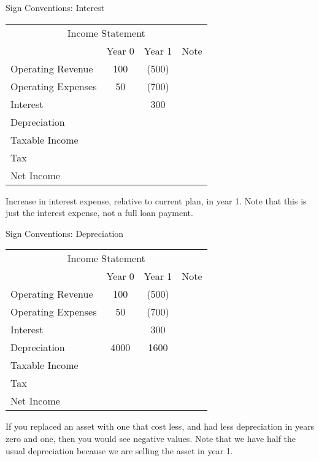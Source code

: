 \documentclass[ignorenonframetext,]{beamer}
\begin{document}
\begin{frame}{Sign Conventions: Interest}

\begin{table}[h]
\begin{tabular}{l||c|c||p{3cm}}
\multicolumn{4}{c}{Income Statement}\\
  &Year 0  &Year 1  &Note\\
\hline
        Operating Revenue   &   100 & (500) &\\
        Operating Expenses  &   50& (700)   &\\
        Interest    &   &   300&\\
        Depreciation    &   &   &\\
        \hline
        Taxable Income  &   &   &\\
        Tax &   &   &\\
        \hline
        Net Income  &   &   &\\
\end{tabular}
\end{table}

Increase in interest expense, relative to current plan, in year 1. Note
that this is just the interest expense, not a full loan payment.

\end{frame}

\begin{frame}{Sign Conventions: Depreciation}

\begin{table}[h]
\begin{tabular}{l||c|c||p{3cm}}
\multicolumn{4}{c}{Income Statement}\\
  &Year 0  &Year 1  &Note\\
\hline
        Operating Revenue   &   100 & (500) &\\
        Operating Expenses  &   50& (700)   &\\
        Interest    &   &   300&\\
        Depreciation    &   4000&   1600&\\
        \hline
        Taxable Income  &   &   &\\
        Tax &   &   &\\
        \hline
        Net Income  &   &   &\\
\end{tabular}
\end{table}

If you replaced an asset with one that cost less, and had less
depreciation in years zero and one, then you would see negative values.
Note that we have half the usual depreciation because we are selling the
asset in year 1.

\end{frame}
\end{document}
